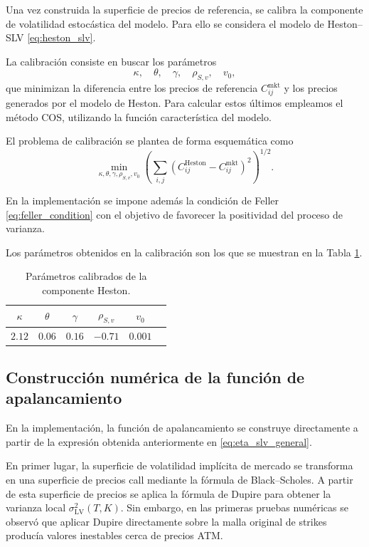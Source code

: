 Una vez construida la superficie de precios de referencia, se calibra la componente de volatilidad estocástica del modelo. Para ello se considera el modelo de Heston--SLV \ref{eq:heston_slv}.

La calibración consiste en buscar los parámetros
\[
    \kappa,\quad \theta,\quad \gamma,\quad \rho_{S,v},\quad v_0,
\]
que minimizan la diferencia entre los precios de referencia $C_{ij}^{\mathrm{mkt}}$ y los precios generados por el modelo de Heston. Para calcular estos últimos empleamos el método COS, utilizando la función característica del modelo.

El problema de calibración se plantea de forma esquemática como
\begin{equation}
    \min_{\kappa,\theta,\gamma,\rho_{S,v},v_0}
    \left(
    \sum_{i,j}
    \left(
        C_{ij}^{\mathrm{Heston}}
        -
        C_{ij}^{\mathrm{mkt}}
    \right)^2
    \right)^{1/2}.
    \label{eq:calibracion_heston_slv_impl}
\end{equation}

En la implementación se impone además la condición de Feller \ref{eq:feller_condition} con el objetivo de favorecer la positividad del proceso de varianza.

Los parámetros obtenidos en la calibración son los que se muestran en la Tabla \ref{tab:parametros_heston_slv}.

\begin{table}[H]
\centering
\begin{tabular}{c c c c c c}
\hline
$\kappa$ & $\theta$ & $\gamma$ & $\rho_{S,v}$ & $v_0$ \\
\hline
$2.12$ & $0.06$ & $0.16$ & $-0.71$ & $0.001$ \\
\hline
\end{tabular}
\caption{Parámetros calibrados de la componente Heston.}
\label{tab:parametros_heston_slv}
\end{table}

\subsection{Construcción numérica de la función de apalancamiento}

En la implementación, la función de apalancamiento se construye directamente a partir de la expresión obtenida anteriormente en \ref{eq:eta_slv_general}.

En primer lugar, la superficie de volatilidad implícita de mercado se transforma en una superficie de precios call mediante la fórmula de Black--Scholes. A partir de esta superficie de precios se aplica la fórmula de Dupire para obtener la varianza local \(\sigma_{\mathrm{LV}}^2(T,K)\). Sin embargo, en las primeras pruebas numéricas se observó que aplicar Dupire directamente sobre la malla original de strikes producía valores inestables cerca de precios ATM.

